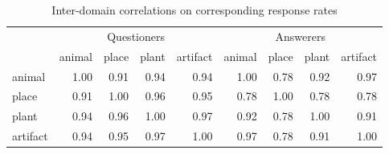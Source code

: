 \documentclass[12pt, floatsintext, jou]{apa6}
\begin{document}
\begin{table}[t!]
\centering
\begin{tabular}{ p{1.5cm} | r | r | r | r |||||| r | r | r | r |}
& \multicolumn{4}{c||||||}{Questioners} & \multicolumn{4}{c}{Answerers} \\
&             animal &     place &     plant &  artifact &            animal &     place &     plant &  artifact \\
\hline
animal &   1.00 &  0.91 & 0.94 & 0.94 & 1.00 & 0.78 & 0.92 &  0.97 \\
\hline
place &    0.91 &  1.00 & 0.96 & 0.95 & 0.78 & 1.00 &  0.78 & 0.78 \\
\hline
plant &    0.94 & 0.96 & 1.00 & 0.97 & 0.92  & 0.78 &  1.00 & 0.91\\
\hline
artifact & 0.94 & 0.95 & 0.97 & 1.00 & 0.97 & 0.78 &  0.91 & 1.00\\
\end{tabular}
\\[1.5pt]
\caption{Inter-domain correlations on corresponding response rates} 
\label{table:experiment4correlations}
\end{table}


%
%
%
\end{document}

